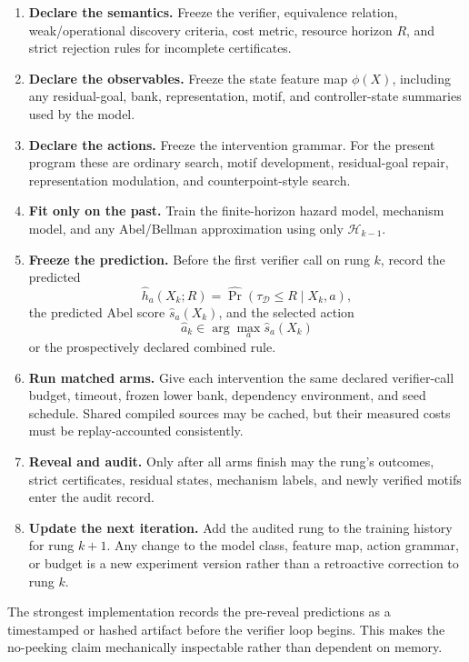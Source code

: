 \begin{enumerate}[label=\textbf{E\arabic*.},leftmargin=2.7em]
\item \textbf{Declare the semantics.} Freeze the verifier, equivalence relation, weak/operational discovery criteria, cost metric, resource horizon $R$, and strict rejection rules for incomplete certificates.
\item \textbf{Declare the observables.} Freeze the state feature map $\phi(X)$, including any residual-goal, bank, representation, motif, and controller-state summaries used by the model.
\item \textbf{Declare the actions.} Freeze the intervention grammar. For the present program these are ordinary search, motif development, residual-goal repair, representation modulation, and counterpoint-style search.
\item \textbf{Fit only on the past.} Train the finite-horizon hazard model, mechanism model, and any Abel/Bellman approximation using only $\mathcal H_{k-1}$.
\item \textbf{Freeze the prediction.} Before the first verifier call on rung $k$, record the predicted
\[
\widehat h_a(X_k;R)=\widehat{\Pr}(\tau_{\mathcal D}\le R\mid X_k,a),
\]
the predicted Abel score $\widehat s_a(X_k)$, and the selected action
\[
\widehat a_k\in\arg\max_a\widehat s_a(X_k)
\]
or the prospectively declared combined rule.
\item \textbf{Run matched arms.} Give each intervention the same declared verifier-call budget, timeout, frozen lower bank, dependency environment, and seed schedule. Shared compiled sources may be cached, but their measured costs must be replay-accounted consistently.
\item \textbf{Reveal and audit.} Only after all arms finish may the rung's outcomes, strict certificates, residual states, mechanism labels, and newly verified motifs enter the audit record.
\item \textbf{Update the next iteration.} Add the audited rung to the training history for rung $k+1$. Any change to the model class, feature map, action grammar, or budget is a new experiment version rather than a retroactive correction to rung $k$.
\end{enumerate}

The strongest implementation records the pre-reveal predictions as a timestamped or hashed artifact before the verifier loop begins. This makes the no-peeking claim mechanically inspectable rather than dependent on memory.

